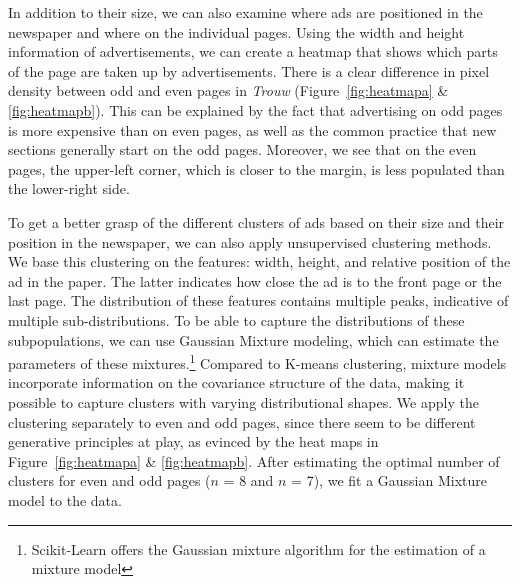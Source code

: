 \documentclass[USenglish]{article}
\begin{document}
In addition to their size, we can also examine where ads are positioned in the newspaper and where on the individual pages. Using the width and height information of advertisements, we can create a heatmap that shows which parts of the page are taken up by advertisements. There is a clear difference in pixel density between odd and even pages in \textit{Trouw} (Figure~\ref{fig:heatmapa} \& \ref{fig:heatmapb}). This can be explained by the fact that advertising on odd pages is more expensive than on even pages, as well as 
the common practice that new sections generally start on the odd pages. Moreover, we see that on the even pages, the upper-left corner, which is closer to the margin, is less populated than the lower-right side. 

To get a better grasp of the different clusters of ads based on their 
size and their position in the newspaper, we can also apply unsupervised clustering methods. We base this clustering on the features: width, height, and relative position of the ad in the paper. The latter indicates how close the ad is to the front page or the last page. The distribution of these features contains multiple peaks, indicative of multiple sub-distributions. To be able to capture the distributions of these subpopulations, we can use Gaussian Mixture modeling, which can estimate the parameters of these mixtures.\footnote{Scikit-Learn offers the Gaussian mixture algorithm for the estimation of a mixture model} Compared to K-means clustering, mixture models incorporate information on the covariance structure of the data, making it possible to capture clusters with varying distributional shapes. We apply the clustering separately to even and odd pages, since there seem to be different generative principles at play, as evinced by the heat maps in Figure~\ref{fig:heatmapa} \& \ref{fig:heatmapb}. After estimating the optimal number of clusters for even and odd pages ($n$ = 8 and $n$ = 7), we fit a Gaussian Mixture model to the data.
\end{document}
